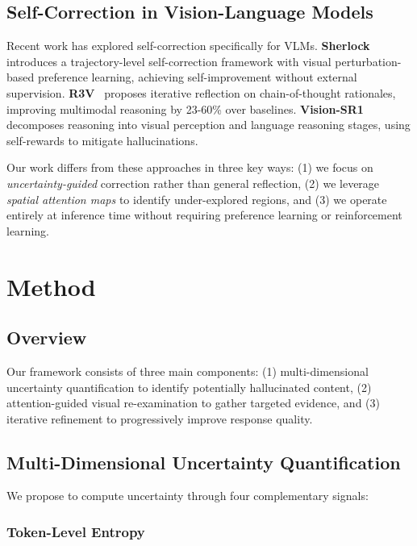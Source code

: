 \documentclass[12pt]{article}
\begin{document}
\subsection{Self-Correction in Vision-Language Models}

Recent work has explored self-correction specifically for VLMs. \textbf{Sherlock}~\citep{ding2025sherlock} introduces a trajectory-level self-correction framework with visual perturbation-based preference learning, achieving self-improvement without external supervision. \textbf{R3V}~\citep{cheng2024r3v} proposes iterative reflection on chain-of-thought rationales, improving multimodal reasoning by 23-60\% over baselines. \textbf{Vision-SR1}~\citep{li2025visionsr1} decomposes reasoning into visual perception and language reasoning stages, using self-rewards to mitigate hallucinations.

Our work differs from these approaches in three key ways: (1) we focus on \textit{uncertainty-guided} correction rather than general reflection, (2) we leverage \textit{spatial attention maps} to identify under-explored regions, and (3) we operate entirely at inference time without requiring preference learning or reinforcement learning.


\section{Method}

\subsection{Overview}

Our framework consists of three main components: (1) multi-dimensional uncertainty quantification to identify potentially hallucinated content, (2) attention-guided visual re-examination to gather targeted evidence, and (3) iterative refinement to progressively improve response quality.

\subsection{Multi-Dimensional Uncertainty Quantification}

We propose to compute uncertainty through four complementary signals:

\subsubsection{Token-Level Entropy}
\end{document}
